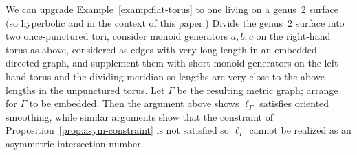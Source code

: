 \begin{example}
  We can upgrade Example~\ref{examp:flat-torus} to one living on a
  genus~$2$ surface (so hyperbolic and in the context of this paper.)
  Divide the genus~$2$ surface into two once-punctured tori, consider
  monoid generators $a,b,c$ on the right-hand torus as above,
  considered as edges with very long length in an embedded directed
  graph, and supplement them with short monoid generators on the
  left-hand torus and the dividing meridian so lengths are very close
  to the above lengths in the unpunctured torus. Let $\Gamma$ be the
  resulting metric graph; arrange for $\Gamma$ to be embedded. Then
  the argument above shows $\ell_\Gamma$ satisfies oriented smoothing,
  while similar arguments show that the constraint of
  Proposition~\ref{prop:asym-constraint}
  is not satisfied so $\ell_\Gamma$ cannot be realized as an asymmetric
  intersection number.
\end{example}

